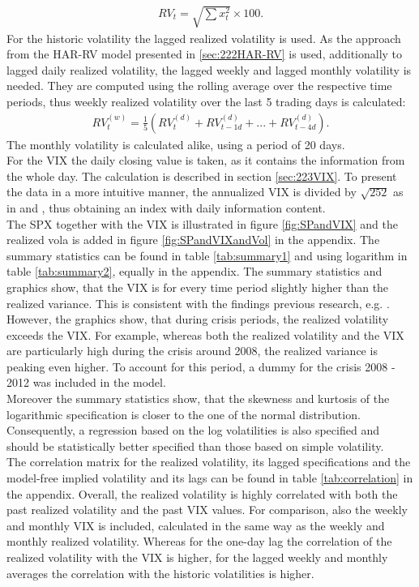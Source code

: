 \begin{align}
RV_{t} = \sqrt{\sum x_{t}^{2}} \times 100.
\end{align}
For the historic volatility the lagged realized volatility is used. As the approach from the HAR-RV model presented in \ref{sec:222HAR-RV} is used, additionally to lagged daily realized volatility, the lagged weekly and lagged monthly volatility is needed. They are computed using the rolling average over the respective time periods, thus weekly realized volatility over the last 5 trading days is calculated:
\begin{align}
RV_{t}^{(w)} = \frac{1}{5} (RV_{t}^{(d)} + RV_{t-1d}^{(d)} + ... + RV_{t-4d}^{(d)}).
\end{align}
The monthly volatility is calculated alike, using a period of 20 days.\\
For the \ac{VIX} the daily closing value is taken, as it contains the information from the whole day. The calculation is described in section \ref{sec:223VIX}. To present the data in a more intuitive manner, the annualized \ac{VIX} is divided by $\sqrt{252}$ as in \textcite{blair2001} and \textcite{whaley2008}, thus obtaining an index with daily information content.\\
The \ac{SPX} together with the \ac{VIX} is illustrated in figure \ref{fig:SPandVIX} and the realized vola is added in figure \ref{fig:SPandVIXandVol} in the appendix. The summary statistics can be found in table \ref{tab:summary1} and using logarithm in table \ref{tab:summary2}, equally in the appendix. The summary statistics and graphics show, that the \ac{VIX} is for every time period slightly higher than the realized variance. This is consistent with the findings previous research, e.g. \textcite{jiang2003}. However, the graphics show, that during crisis periods, the realized volatility exceeds the \ac{VIX}. For example, whereas both the realized volatility and the \ac{VIX} are particularly high during the crisis around 2008, the realized variance is peaking even higher. To account for this period, a dummy for the crisis 2008 - 2012 was included in the model.\\
Moreover the summary statistics show, that the skewness and kurtosis of the logarithmic specification is closer to the one of the normal distribution. Consequently, a regression based on the log volatilities is also specified and should be statistically better specified than those based on simple volatility.\\
The correlation matrix for the realized volatility, its lagged specifications and the model-free implied volatility and its lags can be found in table \ref{tab:correlation} in the appendix. Overall, the realized volatility is highly correlated with both the past realized volatility and the past \ac{VIX} values. For comparison, also the weekly and monthly \ac{VIX} is included, calculated in the same way as the weekly and monthly realized volatility. Whereas for the one-day lag the correlation of the realized volatility with the \ac{VIX} is higher, for the lagged weekly and monthly averages the correlation with the historic volatilities is higher. 

